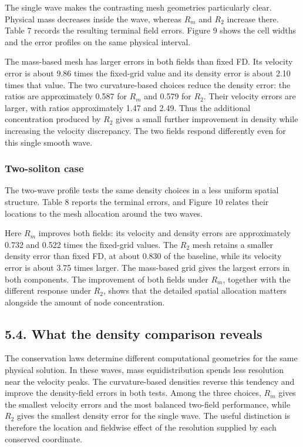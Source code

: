 The single wave makes the contrasting mesh geometries particularly clear. Physical mass decreases inside the wave, whereas \(R_m\) and \(R_2\) increase there. Table 7 records the resulting terminal field errors. Figure 9 shows the cell widths and the error profiles on the same physical interval.


The mass-based mesh has larger errors in both fields than fixed FD. Its velocity error is about 9.86 times the fixed-grid value and its density error is about 2.10 times that value. The two curvature-based choices reduce the density error: the ratios are approximately 0.587 for \(R_m\) and 0.579 for \(R_2\). Their velocity errors are larger, with ratios approximately 1.47 and 2.49. Thus the additional concentration produced by \(R_2\) gives a small further improvement in density while increasing the velocity discrepancy. The two fields respond differently even for this single smooth wave.

\subsubsection*{Two-soliton case}

The two-wave profile tests the same density choices in a less uniform spatial structure. Table 8 reports the terminal errors, and Figure 10 relates their locations to the mesh allocation around the two waves.


Here \(R_m\) improves both fields: its velocity and density errors are approximately 0.732 and 0.522 times the fixed-grid values. The \(R_2\) mesh retains a smaller density error than fixed FD, at about 0.830 of the baseline, while its velocity error is about 3.75 times larger. The mass-based grid gives the largest errors in both components. The improvement of both fields under \(R_m\), together with the different response under \(R_2\), shows that the detailed spatial allocation matters alongside the amount of node concentration.


\subsection*{5.4. What the density comparison reveals}

The conservation laws determine different computational geometries for the same physical solution. In these waves, mass equidistribution spends less resolution near the velocity peaks. The curvature-based densities reverse this tendency and improve the density-field errors in both tests. Among the three choices, \(R_m\) gives the smallest velocity errors and the most balanced two-field performance, while \(R_2\) gives the smallest density error for the single wave. The useful distinction is therefore the location and fieldwise effect of the resolution supplied by each conserved coordinate.

